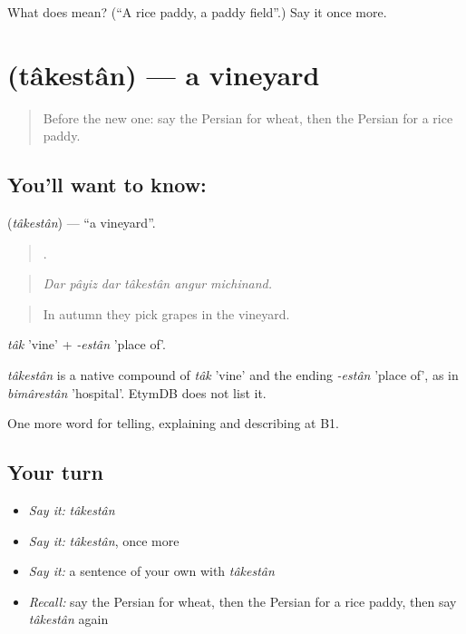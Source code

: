 \begin{tcolorbox}[breakable,colback=teal!4,colframe=teal!35!black,title={Before you move on}]
What does  mean? (\textquotedblleft{}A rice paddy, a paddy field\textquotedblright{}.) Say it once more.
\end{tcolorbox}
\section[\texorpdfstring{\fa{تاکستان} (tâkestân)}{تاکستان (tâkestân)}]{ (tâkestân) — a vineyard}

\label{lesson:FA-C465-takestan}



\begin{quote}
Before the new one: say the Persian for wheat, then the Persian for a rice paddy.
\end{quote}

\subsection*{You'll want to know: }
\textbf{} (\emph{tâkestân}) — \textquotedblleft{}a vineyard\textquotedblright{}.

\begin{quote}
     .
\end{quote}

\begin{quote}
\emph{Dar pâyiz dar tâkestân angur michinand.}
\end{quote}

\begin{quote}
In autumn they pick grapes in the vineyard.
\end{quote}

\emph{tâk} 'vine' + \emph{-estân} 'place of'.

\begin{cousinweb}
\emph{tâkestân} is a native compound of \emph{tâk} 'vine' and the ending \emph{-estân} 'place of', as in \emph{bimârestân} 'hospital'. EtymDB does not list it.
\end{cousinweb}

\begin{grammarlens}[title={What you've built}]
One more word for telling, explaining and describing at B1.
\end{grammarlens}

\subsection*{Your turn}
\begin{itemize}
\raggedright
  \item \emph{Say it:} \emph{tâkestân}
  \item \emph{Say it:} \emph{tâkestân}, once more
  \item \emph{Say it:} a sentence of your own with \emph{tâkestân}
  \item \emph{Recall:} say the Persian for wheat, then the Persian for a rice paddy, then say \emph{tâkestân} again
\end{itemize}

